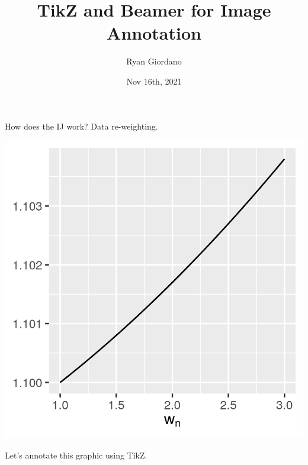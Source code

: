 \documentclass[8pt]{beamer}\usepackage[]{graphicx}\usepackage[]{color}
\title{TikZ and Beamer for Image Annotation}
\author{Ryan Giordano}
\date{Nov 16th, 2021}
\institute{Massachusetts Institute of Technology}
\begin{document}

\begin{frame}[fragile]{How does the IJ work?  Data re-weighting.}

\begin{center}
\begin{minipage}{0.38\textwidth}
\includegraphics[width=\textwidth]{e_beta_w}
\end{minipage}
\end{center}

\hrulefill

Let's annotate this graphic using TikZ.


\end{frame}
\end{document}

